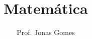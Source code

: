 


\frontmatter
\title{Matemática}
\author{Prof. Jonas Gomes}
\date{}
\maketitle
%
\tableofcontents
\mainmatter





